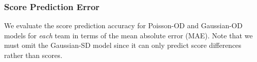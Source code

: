 \subsubsection{Score Prediction Error}
\label{sec:scorePredictionError}





We evaluate the score prediction accuracy for Poisson-OD and
Gaussian-OD models for \emph{each} team in terms of the mean absolute
error (MAE). Note that we must omit the Gaussian-SD model since it can only
predict score differences rather than scores.


